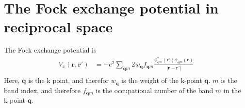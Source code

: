 \documentclass[a4paper,12pt]{article}
\begin{document}
\newpage


\section{The Fock exchange potential in reciprocal space}
The Fock exchange potential is
\begin{equation}
    \begin{split}
        V_{x}(\boldsymbol{r},\boldsymbol{r}')&=
        -e^2\sum_{\boldsymbol{q}m}2w_{\boldsymbol{q}}f_{\boldsymbol{q}m}
        \frac{\phi_{\boldsymbol{q}m}^{*}(\boldsymbol{r}')\phi_{\boldsymbol{q}m}(\boldsymbol{r})}{|\boldsymbol{r}-\boldsymbol{r}'|}\\
    \end{split}
\end{equation}
Here, $\boldsymbol{q}$ is the k point, and therefor $w_{\boldsymbol{q}}$ is the weight of the k-point $\boldsymbol{q}$. $m$ is the band index, and
therefore $f_{\boldsymbol{q}m}$ is the occupational number of the band $m$ in the k-point $\boldsymbol{q}$.
\end{document}
